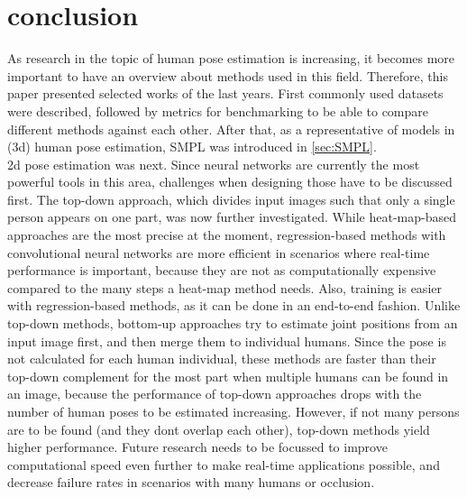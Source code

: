 \section{conclusion}
As research in the topic of human pose estimation is increasing, it becomes more important to have an overview about methods used in this field. Therefore, this paper presented selected works of the last years. First commonly used datasets were described, followed by metrics for benchmarking to be able to compare different methods against each other. After that, as a representative of models in (3d) human pose estimation, SMPL was introduced in \autoref{sec:SMPL}. 
\\2d pose estimation was next. Since neural networks are currently the most powerful tools in this area, challenges when designing those have to be discussed first. The top-down approach, which divides input images such that only a single person appears on one part, was now further investigated. While heat-map-based approaches are the most precise at the moment, regression-based methods with convolutional neural networks are more efficient in scenarios where real-time performance is important, because they are not as computationally expensive compared to the many steps a heat-map method needs. Also, training is easier with regression-based methods, as it can be done in an end-to-end fashion. Unlike top-down methods, bottom-up approaches try to estimate joint positions from an input image first, and then merge them to individual humans. Since the pose is not calculated for each human individual, these methods are faster than their top-down complement for the most part when multiple humans can be found in an image, because the performance of top-down approaches drops with the number of human poses to be estimated increasing. However, if not many persons are to be found (and they dont overlap each other), top-down methods yield higher performance. Future research needs to be focussed to improve computational speed even further to make real-time applications possible, and decrease failure rates in scenarios with many humans or occlusion.